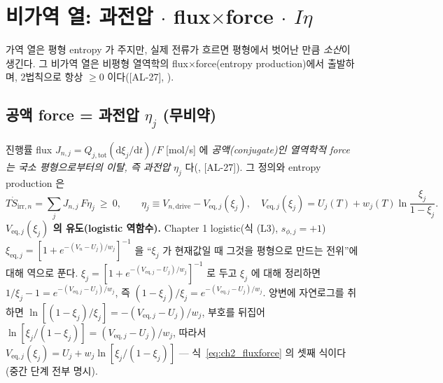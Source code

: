 \documentclass[11pt,a4paper]{article}
\newcommand{\dd}{\mathrm{d}}
\newcommand{\eq}{\mathrm{eq}}
\newcommand{\drive}{\mathrm{drive}}
\newcommand{\tot}{\mathrm{tot}}
\newcommand{\irr}{\mathrm{irr}}
\newcommand{\AL}[1]{\textsf{[AL-#1]}}
\begin{document}
\section{비가역 열: 과전압 $\cdot$ flux$\times$force $\cdot$ $I\eta$}\label{sec:ch2_irr}
가역 열은 평형 entropy 가 주지만, 실제 전류가 흐르면 평형에서 벗어난 만큼 \emph{소산}이 생긴다. 그 비가역 열은
비평형 열역학의 flux$\times$force(entropy production)에서 출발하며, 2법칙으로 항상 $\ge0$ 이다(\AL{27},
\cite{degrootmazur1962,onsager1931}).

\subsection{공액 force = 과전압 $\eta_j$ (무비약)}\label{sec:ch2_fluxforce}
진행률 flux $J_{n,j}=Q_{j,\tot}(\dd\xi_j/\dd t)/F$ [mol/s] 에 \emph{공액(conjugate)인 열역학적 force 는
국소 평형으로부터의 이탈, 즉 과전압} $\eta_j$ 다(\cite{newman,bardfaulkner}, \AL{27}). 그 정의와 entropy
production 은
\begin{equation}
T\dot S_{\irr,n}=\sum_j J_{n,j}\,F\eta_j\ \ge\ 0,\qquad
\eta_j\equiv V_{n,\drive}-V_{\eq,j}(\xi_j),\quad
V_{\eq,j}(\xi_j)=U_j(T)+w_j(T)\ln\frac{\xi_j}{1-\xi_j}.
\label{eq:ch2_fluxforce}
\end{equation}
\textbf{$V_{\eq,j}(\xi_j)$ 의 유도(logistic 역함수).} Chapter 1 logistic(식 (L3), $s_{\phi,j}=+1$)
$\xi_{\eq,j}=[1+e^{-(V_n-U_j)/w_j}]^{-1}$ 을 ``$\xi_j$ 가 현재값일 때 그것을 평형으로 만드는 전위''에 대해
역으로 푼다. $\xi_j=[1+e^{-(V_{\eq,j}-U_j)/w_j}]^{-1}$ 로 두고 $\xi_j$ 에 대해 정리하면 $1/\xi_j-1=e^{-(V_{\eq,j}-U_j)/w_j}$,
즉 $(1-\xi_j)/\xi_j=e^{-(V_{\eq,j}-U_j)/w_j}$. 양변에 자연로그를 취하면 $\ln[(1-\xi_j)/\xi_j]=-(V_{\eq,j}-U_j)/w_j$,
부호를 뒤집어 $\ln[\xi_j/(1-\xi_j)]=(V_{\eq,j}-U_j)/w_j$, 따라서 $V_{\eq,j}(\xi_j)=U_j+w_j\ln[\xi_j/(1-\xi_j)]$
— 식~\eqref{eq:ch2_fluxforce} 의 셋째 식이다(중간 단계 전부 명시).
\end{document}
